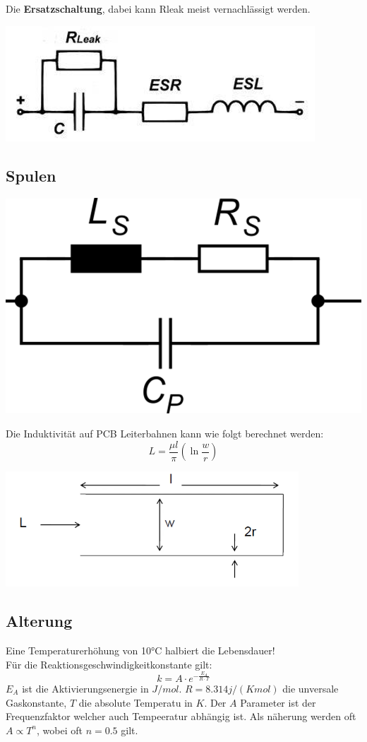 Die \textbf{Ersatzschaltung}, dabei kann Rleak meist vernachlässigt werden.
\begin{center}
	\includegraphics[width=0.6\columnwidth]{Images/kondensator1}
\end{center}


\subsection{Spulen}
\begin{center}
	\includegraphics[width=0.6\columnwidth]{Images/spule}
\end{center}
Die Induktivität auf PCB Leiterbahnen kann wie folgt berechnet werden:
\[
L = \frac{\mu l}{\pi}\left(\ln\frac{w}{r}\right)
\]
\begin{center}
	\includegraphics[width=0.6\columnwidth]{Images/spule1}
\end{center}

\subsection{Alterung}
Eine Temperaturerhöhung von 10°C halbiert die Lebensdauer!\\

Für die Reaktionsgeschwindigkeitkonstante gilt:
\[
k = A\cdot e^{-\frac{E_A}{R\cdot T}}
\]
$E_A$ ist die Aktivierungsenergie in $J/mol$. $R = 8.314 j/(K mol)$ die unversale Gaskonstante, $T$ die absolute Temperatu in $K$. Der $A$ Parameter ist der Frequenzfaktor welcher auch Tempeeratur abhängig ist. Als näherung werden oft $A \propto T^n$, wobei oft $n=0.5$ gilt.

